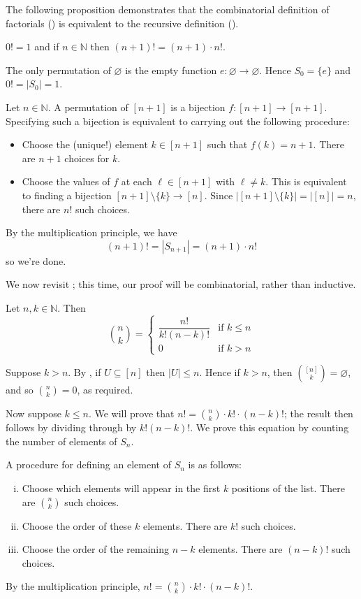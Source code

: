 The following proposition demonstrates that the combinatorial definition of factorials () is equivalent to the recursive definition ().

\begin{theorem}
\label{thmFactorialAsProduct}
$0!=1$ and if $n \in \mathbb{N}$ then $(n+1)! = (n+1) \cdot n!$.
\end{theorem}
\begin{cproof}
The only permutation of $\varnothing$ is the empty function $e : \varnothing \to \varnothing$. Hence $S_0 = \{ e \}$ and $0!=|S_0|=1$.

Let $n \in \mathbb{N}$. A permutation of $[n+1]$ is a bijection $f : [n+1] \to [n+1]$. Specifying such a bijection is equivalent to carrying out the following procedure:
\begin{itemize}
\item Choose the (unique!) element $k \in [n+1]$ such that $f(k) = n+1$. There are $n+1$ choices for $k$.
\item Choose the values of $f$ at each $\ell \in [n+1]$ with $\ell \ne k$. This is equivalent to finding a bijection $[n+1] \setminus \{ k \} \to [n]$. Since $|[n+1] \setminus \{ k \}| = |[n]| = n$, there are $n!$ such choices.
\end{itemize}
By the multiplication principle, we have
\[ (n+1)! = |S_{n+1}| = (n+1) \cdot n! \]
so we're done.
\end{cproof}

We now revisit ; this time, our proof will be combinatorial, rather than inductive.

\begin{theorem} \label{thmBinomAsFactorial}
Let $n, k \in \mathbb{N}$. Then
\[ \binom{n}{k} = \begin{cases} \dfrac{n!}{k!(n-k)!} & \text{if } k \le n \\ 0 & \text{if } k > n \end{cases} \]
\end{theorem}
\begin{cproof}
Suppose $k>n$. By , if $U \subseteq [n]$ then $|U| \le n$. Hence if $k > n$, then $\binom{[n]}{k} = \varnothing$, and so $\binom{n}{k}=0$, as required.

Now suppose $k \le n$. We will prove that $n! = \binom{n}{k} \cdot k! \cdot (n-k)!$; the result then follows by dividing through by $k!(n-k)!$. We prove this equation by counting the number of elements of $S_n$.

A procedure for defining an element of $S_n$ is as follows:
\begin{enumerate}[(i)]
\item Choose which elements will appear in the first $k$ positions of the list. There are $\binom{n}{k}$ such choices.
\item Choose the order of these $k$ elements. There are $k!$ such choices.
\item Choose the order of the remaining $n-k$ elements. There are $(n-k)!$ such choices.
\end{enumerate}
By the multiplication principle, $n! = \binom{n}{k} \cdot k! \cdot (n-k)!$.
\end{cproof}

